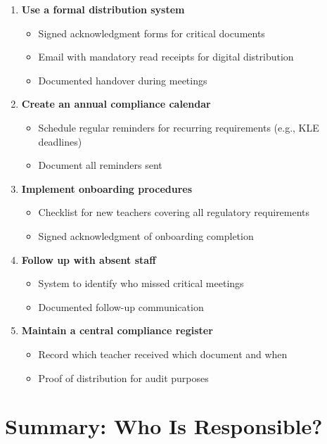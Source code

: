 \documentclass[11pt,a4paper]{article}
\begin{document}
\begin{enumerate}
    \item \textbf{Use a formal distribution system}
    \begin{itemize}
        \item Signed acknowledgment forms for critical documents
        \item Email with mandatory read receipts for digital distribution
        \item Documented handover during meetings
    \end{itemize}

    \item \textbf{Create an annual compliance calendar}
    \begin{itemize}
        \item Schedule regular reminders for recurring requirements (e.g., KLE deadlines)
        \item Document all reminders sent
    \end{itemize}

    \item \textbf{Implement onboarding procedures}
    \begin{itemize}
        \item Checklist for new teachers covering all regulatory requirements
        \item Signed acknowledgment of onboarding completion
    \end{itemize}

    \item \textbf{Follow up with absent staff}
    \begin{itemize}
        \item System to identify who missed critical meetings
        \item Documented follow-up communication
    \end{itemize}

    \item \textbf{Maintain a central compliance register}
    \begin{itemize}
        \item Record which teacher received which document and when
        \item Proof of distribution for audit purposes
    \end{itemize}
\end{enumerate}

\section{Summary: Who Is Responsible?}
\end{document}
